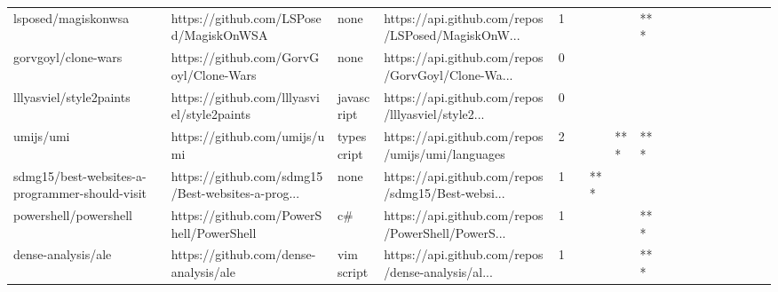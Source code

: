 \begin{tabular}{llllrlllllllllllll}
lsposed/magiskonwsa                                &             https://github.com/LSPosed/MagiskOnWSA &              none &  https://api.github.com/repos/LSPosed/MagiskOnW... &       1 &         &        &           &            *** &                 &        &           &           &          &          &       &              &          \\
gorvgoyl/clone-wars                                &             https://github.com/GorvGoyl/Clone-Wars &              none &  https://api.github.com/repos/GorvGoyl/Clone-Wa... &       0 &         &        &           &                &                 &        &           &           &          &          &       &              &          \\
lllyasviel/style2paints                            &         https://github.com/lllyasviel/style2paints &        javascript &  https://api.github.com/repos/lllyasviel/style2... &       0 &         &        &           &                &                 &        &           &           &          &          &       &              &          \\
umijs/umi                                          &                       https://github.com/umijs/umi &        typescript &   https://api.github.com/repos/umijs/umi/languages &       2 &         &        &       *** &            *** &                 &        &           &           &          &          &       &              &          \\
sdmg15/best-websites-a-programmer-should-visit     &  https://github.com/sdmg15/Best-websites-a-prog... &              none &  https://api.github.com/repos/sdmg15/Best-websi... &       1 &         &    *** &           &                &                 &        &           &           &          &          &       &              &          \\
powershell/powershell                              &           https://github.com/PowerShell/PowerShell &                c\# &  https://api.github.com/repos/PowerShell/PowerS... &       1 &         &        &           &            *** &                 &        &           &           &          &          &       &              &          \\
dense-analysis/ale                                 &              https://github.com/dense-analysis/ale &        vim script &  https://api.github.com/repos/dense-analysis/al... &       1 &         &        &           &            *** &                 &        &           &           &          &          &       &              &          \\

\end{tabular}
